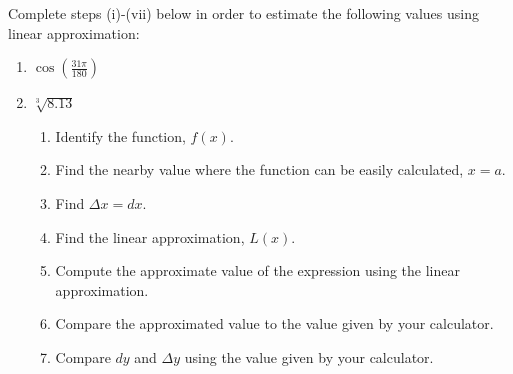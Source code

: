 \documentclass[nooutcomes,handout]{ximera}
\begin{document}
\begin{problem}

Complete steps (i)-(vii) below in order to estimate the following values using linear approximation:
\begin{enumerate}
	\item $\cos \left( \frac{31 \pi}{180} \right)$	
	\item $\sqrt[3]{8.13} $
\begin{enumerate}
\item Identify the function, $f(x)$.
\item  Find the nearby value where the function can be easily calculated, $x=a$.
\item Find $\Delta x=dx$.
\item  Find the linear approximation, $L(x)$.  
\item  Compute the approximate value of the expression using the linear approximation.
\item  Compare the approximated value to the value given by your calculator.
\item  Compare $dy$ and $\Delta y$ using the value given by your calculator.
\end{enumerate}
\end{enumerate}


\end{problem}
\end{document}
